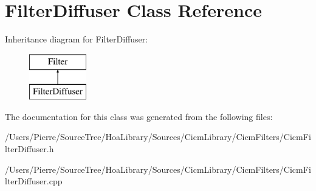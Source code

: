 \hypertarget{class_filter_diffuser}{\section{Filter\-Diffuser Class Reference}
\label{class_filter_diffuser}
}
Inheritance diagram for Filter\-Diffuser\-:\begin{figure}[H]
\begin{center}
\leavevmode
\includegraphics[height=2.000000cm]{class_filter_diffuser}
\end{center}
\end{figure}


The documentation for this class was generated from the following files\-:\begin{DoxyCompactItemize}
\item 
/\-Users/\-Pierre/\-Source\-Tree/\-Hoa\-Library/\-Sources/\-Cicm\-Library/\-Cicm\-Filters/Cicm\-Filter\-Diffuser.\-h\item 
/\-Users/\-Pierre/\-Source\-Tree/\-Hoa\-Library/\-Sources/\-Cicm\-Library/\-Cicm\-Filters/Cicm\-Filter\-Diffuser.\-cpp\end{DoxyCompactItemize}
